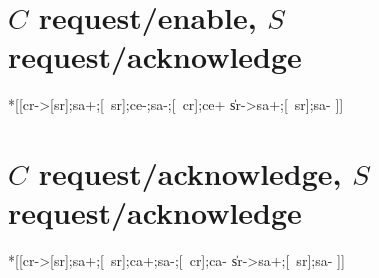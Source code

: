 \documentclass{article}
\begin{document}
\section{$C$ request/enable, $S$ request/acknowledge}

\begin{hse}
*[[cr->[sr];sa+;[~sr];ce-;sa-;[~cr];ce+
  \|sr->sa+;[~sr];sa-
 ]]
\end{hse}

\section{$C$ request/acknowledge, $S$ request/acknowledge}

\begin{hse}
*[[cr->[sr];sa+;[~sr];ca+;sa-;[~cr];ca-
  \|sr->sa+;[~sr];sa-
 ]]
\end{hse}

\end{document}
